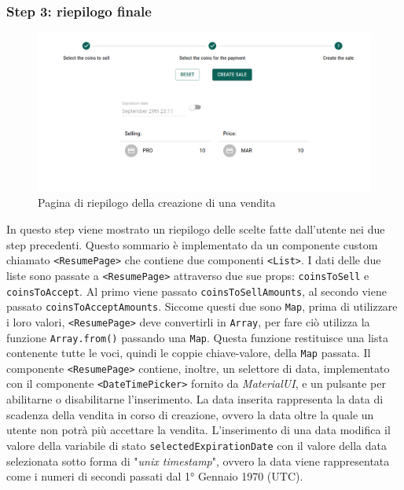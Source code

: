 \documentclass[a4paper]{article}
\begin{document}
        \subsubsection{Step 3: riepilogo finale}
        \begin{figure}[H]
          \includegraphics[width=\textwidth]{resume.png}
          \caption{Pagina di riepilogo della creazione di una vendita}
          \centering
          \label{fig:resume}
        \end{figure}
        In questo step viene mostrato un riepilogo delle scelte fatte dall'utente nei due step precedenti. Questo sommario è implementato da un componente custom chiamato \verb|<ResumePage>| che contiene due componenti \verb|<List>|.
        I dati delle due liste sono passate a \verb|<ResumePage>| attraverso due sue props: \verb|coinsToSell| e \verb|coinsToAccept|. Al primo viene passato \verb|coinsToSellAmounts|, al secondo viene passato \verb|coinsToAcceptAmounts|.
        Siccome questi due sono \verb|Map|, prima di utilizzare i loro valori, \verb|<ResumePage>| deve convertirli in \verb|Array|, per fare ciò utilizza la funzione \verb|Array.from()| passando una \verb|Map|.
        Questa funzione restituisce una lista contenente tutte le voci, quindi le coppie chiave-valore, della \verb|Map| passata.
        \newline
        Il componente \verb|<ResumePage>| contiene, inoltre, un selettore di data, implementato con il componente \verb|<DateTimePicker>| fornito da \emph{MaterialUI}, e un pulsante per abilitarne o disabilitarne l'inserimento.
        La data inserita rappresenta la data di scadenza della vendita in corso di creazione, ovvero la data oltre la quale un utente non potrà più accettare la vendita. L'inserimento di una data modifica il valore della variabile di stato \verb|selectedExpirationDate| con il
        valore della data selezionata sotto forma di "\emph{unix timestamp}", ovvero la data viene rappresentata come i numeri di secondi passati dal 1° Gennaio 1970 (UTC).
\end{document}
